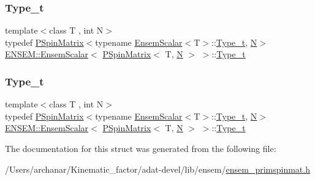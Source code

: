 \subsubsection{\texorpdfstring{Type\_t}{Type\_t}\hspace{0.1cm}{\footnotesize\ttfamily [2/3]}}
{\footnotesize\ttfamily template$<$class T , int N$>$ \\
typedef \mbox{\hyperlink{classENSEM_1_1PSpinMatrix}{P\+Spin\+Matrix}}$<$typename \mbox{\hyperlink{structENSEM_1_1EnsemScalar}{Ensem\+Scalar}}$<$T$>$\+::\mbox{\hyperlink{structENSEM_1_1EnsemScalar_3_01PSpinMatrix_3_01T_00_01N_01_4_01_4_a45d77e25a68437833d711402b4dfd773}{Type\+\_\+t}}, \mbox{\hyperlink{adat__devel_2lib_2hadron_2operator__name__util_8cc_a7722c8ecbb62d99aee7ce68b1752f337}{N}}$>$ \mbox{\hyperlink{structENSEM_1_1EnsemScalar}{E\+N\+S\+E\+M\+::\+Ensem\+Scalar}}$<$ \mbox{\hyperlink{classENSEM_1_1PSpinMatrix}{P\+Spin\+Matrix}}$<$ T, \mbox{\hyperlink{adat__devel_2lib_2hadron_2operator__name__util_8cc_a7722c8ecbb62d99aee7ce68b1752f337}{N}} $>$ $>$\+::\mbox{\hyperlink{structENSEM_1_1EnsemScalar_3_01PSpinMatrix_3_01T_00_01N_01_4_01_4_a45d77e25a68437833d711402b4dfd773}{Type\+\_\+t}}}

\mbox{\label{structENSEM_1_1EnsemScalar_3_01PSpinMatrix_3_01T_00_01N_01_4_01_4_a45d77e25a68437833d711402b4dfd773}} 
\subsubsection{\texorpdfstring{Type\_t}{Type\_t}\hspace{0.1cm}{\footnotesize\ttfamily [3/3]}}
{\footnotesize\ttfamily template$<$class T , int N$>$ \\
typedef \mbox{\hyperlink{classENSEM_1_1PSpinMatrix}{P\+Spin\+Matrix}}$<$typename \mbox{\hyperlink{structENSEM_1_1EnsemScalar}{Ensem\+Scalar}}$<$T$>$\+::\mbox{\hyperlink{structENSEM_1_1EnsemScalar_3_01PSpinMatrix_3_01T_00_01N_01_4_01_4_a45d77e25a68437833d711402b4dfd773}{Type\+\_\+t}}, \mbox{\hyperlink{adat__devel_2lib_2hadron_2operator__name__util_8cc_a7722c8ecbb62d99aee7ce68b1752f337}{N}}$>$ \mbox{\hyperlink{structENSEM_1_1EnsemScalar}{E\+N\+S\+E\+M\+::\+Ensem\+Scalar}}$<$ \mbox{\hyperlink{classENSEM_1_1PSpinMatrix}{P\+Spin\+Matrix}}$<$ T, \mbox{\hyperlink{adat__devel_2lib_2hadron_2operator__name__util_8cc_a7722c8ecbb62d99aee7ce68b1752f337}{N}} $>$ $>$\+::\mbox{\hyperlink{structENSEM_1_1EnsemScalar_3_01PSpinMatrix_3_01T_00_01N_01_4_01_4_a45d77e25a68437833d711402b4dfd773}{Type\+\_\+t}}}



The documentation for this struct was generated from the following file\+:\begin{DoxyCompactItemize}
\item 
/\+Users/archanar/\+Kinematic\+\_\+factor/adat-\/devel/lib/ensem/\mbox{\hyperlink{adat-devel_2lib_2ensem_2ensem__primspinmat_8h}{ensem\+\_\+primspinmat.\+h}}\end{DoxyCompactItemize}

